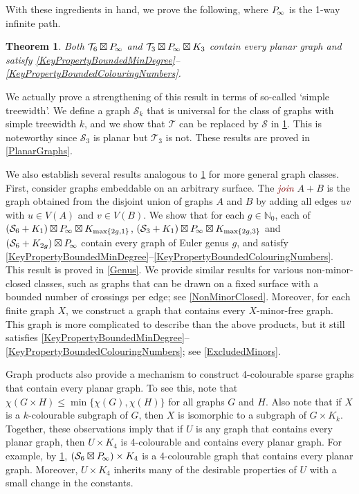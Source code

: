 \documentclass[a4paper,11pt]{article}
\newcommand{\defn}[1]{\textcolor{Maroon}{\emph{#1}}\index{#1}}
\theoremstyle{plain}
\newtheorem{thm}{Theorem}[section]
\theoremstyle{definition}
\renewcommand{\leq}{\leqslant}
\newcommand{\PP}{P_{\hspace{-0.25ex}\infty}}
\newcommand{\TT}{\mathcal{T}}
\newcommand{\NN}{\mathbb{N}}
\renewcommand{\SS}{\mathcal{S}}
\begin{document}
With these ingredients in hand, we prove the following, where $\PP$ is the 1-way infinite path.

\begin{thm}
\label{InfinitePlanarStructure}
Both $\TT_6\boxtimes\PP$ and $\TT_3\boxtimes\PP\boxtimes K_3$  contain every planar graph and satisfy \cref{KeyPropertyBoundedMinDegree}--\cref{KeyPropertyBoundedColouringNumbers}.
\end{thm}

We actually prove a strengthening of this result in terms of so-called `simple treewidth'. We define a graph $\SS_k$ that is universal for the class of graphs with simple treewidth $k$, and we show that $\TT$ can be replaced by $\SS$ in \cref{InfinitePlanarStructure}. This is noteworthy since $\SS_3$ is planar but $\TT_3$ is not. These results are proved in \cref{PlanarGraphs}. 

We also establish several results analogous to \cref{InfinitePlanarStructure} for more general graph classes. First, consider graphs embeddable on an arbitrary surface. The \defn{join} $A+B$ is the graph obtained from the disjoint union of graphs $A$ and $B$ by adding all edges $uv$ with $u\in V(A)$ and $v \in V(B)$. 
We show that for each $g\in\NN_0$, each of  
$(\SS_6+K_1) \boxtimes \PP \boxtimes K_{\max\{2g,1\}}$, 
$(\SS_3+K_1) \boxtimes \PP \boxtimes K_{\max\{2g,3\}}$ and
$(\SS_6 +K_{2g} )  \boxtimes \PP$ contain every graph of Euler genus $g$, and satisfy \cref{KeyPropertyBoundedMinDegree}--\cref{KeyPropertyBoundedColouringNumbers}. This result is proved in \cref{Genus}. We provide similar results for various non-minor-closed classes, such as graphs that can be drawn on a fixed surface with a bounded number of crossings per edge; see \cref{NonMinorClosed}. Moreover, for each finite graph $X$, we construct a graph that contains every $X$-minor-free graph. This graph is more complicated to describe than the above products, but it still satisfies \cref{KeyPropertyBoundedMinDegree}--\cref{KeyPropertyBoundedColouringNumbers}; see \cref{ExcludedMinors}. 

Graph products also provide a mechanism to construct 4-colourable  sparse graphs that contain every planar graph. To see this, note that $\chi(G\times H)\leq\min\{\chi(G),\chi(H)\}$ for all graphs $G$ and $H$. Also note that if $X$ is a $k$-colourable subgraph of $G$, then $X$ is isomorphic to a subgraph of $G\times K_k$. Together, these observations imply that if $U$ is any graph that contains every planar graph, then $U \times K_4$ is 4-colourable and contains every planar graph. For example,  by \cref{InfinitePlanarStructure}, $(\SS_6\boxtimes\PP) \times K_4$ is a 4-colourable graph that contains every planar graph. Moreover, $U\times K_4$ inherits many of the desirable properties of $U$ with a small change in the constants.
\end{document}

